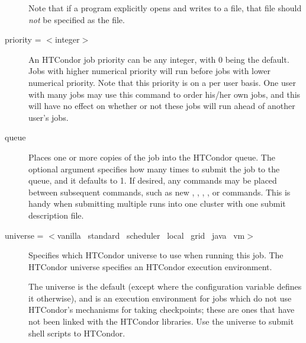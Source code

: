 \begin{description}
Note that if a program explicitly opens and writes to a file,
that file should \emph{not} be specified as the  file.


\label{man-condor-submit-priority}
\item[priority = $<$integer$>$] 
An HTCondor job priority 
can be any integer, with 0 being the default.
Jobs with higher numerical priority will
run before jobs with lower numerical priority. Note that this priority
is on a per user basis.
One user with many jobs may use this command
to order his/her own jobs,
and this will have no effect on whether or
not these jobs will run ahead of another user's jobs.


\label{man-condor-submit-queue}
\item[queue \oOptnm{number-of-procs}] Places one or more
copies of the job into the HTCondor queue.
The optional
argument  specifies how many times to submit the
job to the queue, and it defaults to 1.
If desired, any commands may be placed
between subsequent  commands, such as new ,
, , ,
or  commands.
This is handy when submitting multiple runs into one cluster with
one submit description file.


\label{man-condor-submit-universe}
\item[universe = $<$vanilla \Bar\ standard \Bar\ scheduler
\Bar\ local \Bar\ grid \Bar\ java \Bar\ vm$>$]
Specifies which HTCondor universe to use when running this job.  The HTCondor
universe specifies an HTCondor execution environment.

The  universe is the default (except where the
configuration variable  defines it
otherwise), and is an execution environment for jobs which do not
use HTCondor's mechanisms for taking checkpoints;
these are ones that have not been linked with the HTCondor libraries.  
Use the  universe to submit shell scripts to HTCondor.


\end{description}
